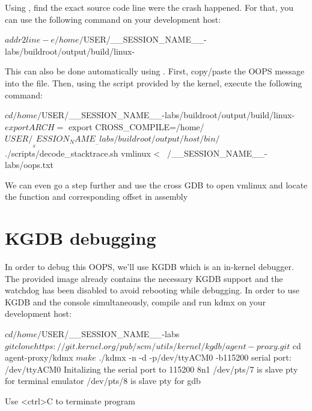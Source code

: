 Using , find the exact source code line were the crash happened.
For that, you can use the following command on your development host:

\begin{bashinput}
$ addr2line -e /home/$USER/__SESSION_NAME__-labs/buildroot/output/build/linux-%
\end{bashinput}

This can also be done automatically using . First,
copy/paste the OOPS message into the  file.
Then, using the script provided by the kernel, execute the following command:

\begin{bashinput}
$ cd /home/$USER/__SESSION_NAME__-labs/buildroot/output/build/linux-%
$ export ARCH=%
$ export CROSS_COMPILE=/home/$USER/__SESSION_NAME__-labs/buildroot/output/host/bin/%
$ ./scripts/decode_stacktrace.sh vmlinux < ~/__SESSION_NAME__-labs/oops.txt
\end{bashinput}

We can even go a step further and use the cross GDB to open vmlinux and
locate the function and corresponding offset in assembly


\section{KGDB debugging}
In order to debug this OOPS, we'll use KGDB which is an in-kernel debugger.
The provided image already contains the necessary KGDB support and the watchdog
has been disabled to avoid rebooting while debugging. In order to use KGDB and
the console simultaneously, compile and run kdmx on your development host:

\begin{bashinput}
$ cd /home/$USER/__SESSION_NAME__-labs
$ git clone https://git.kernel.org/pub/scm/utils/kernel/kgdb/agent-proxy.git
$ cd agent-proxy/kdmx
$ make
$ ./kdmx -n -d -p/dev/ttyACM0 -b115200
serial port: /dev/ttyACM0
Initalizing the serial port to 115200 8n1
/dev/pts/7 is slave pty for terminal emulator
/dev/pts/8 is slave pty for gdb

Use <ctrl>C to terminate program
\end{bashinput}

